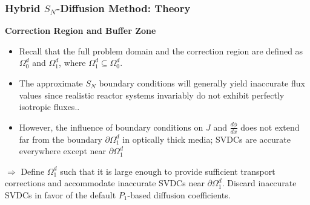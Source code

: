 \begin{frame}
  \frametitle{Hybrid $S_N$-Diffusion Method: Theory}
  \textbf{Correction Region and Buffer Zone}
  \begin{itemize}
    \item Recall that the full problem domain and the correction region are defined as $\Omega^d_0$
      and $\Omega^d_1$, where $\Omega^d_1 \subseteq \Omega^d_0$.
    \item The approximate $S_N$ boundary conditions will generally yield inaccurate flux values
      since realistic reactor systems invariably do not exhibit perfectly isotropic fluxes..
    \item However, the influence of boundary conditions on $J$ and $\frac{d\phi}{dx}$ does not
      extend far from the boundary $\partial\Omega^d_1$ in optically thick media; SVDCs are
      accurate everywhere except near $\partial\Omega^d_1$
  \end{itemize}
  \pause
  $\Rightarrow$ Define $\Omega^d_1$ such that it is large enough to provide sufficient transport
  corrections and accommodate inaccurate SVDCs near $\partial\Omega^d_1$. Discard inaccurate SVDCs
  in favor of the default $P_1$-based diffusion coefficients.
\end{frame}

